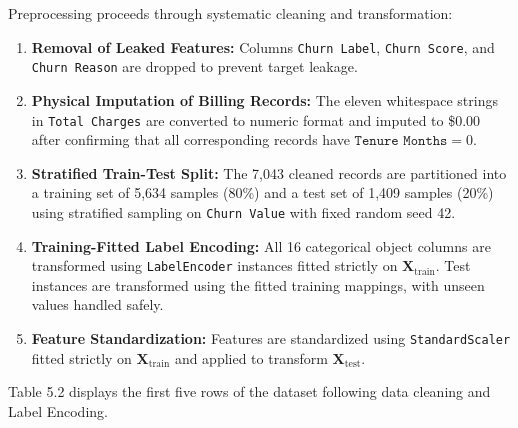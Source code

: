 \documentclass[12pt,oneside]{report}
\begin{document}
Preprocessing proceeds through systematic cleaning and transformation:
\begin{enumerate}
    \item \textbf{Removal of Leaked Features:} Columns \texttt{Churn Label}, \texttt{Churn Score}, and \texttt{Churn Reason} are dropped to prevent target leakage.
    \item \textbf{Physical Imputation of Billing Records:} The eleven whitespace strings in \texttt{Total Charges} are converted to numeric format and imputed to \$0.00 after confirming that all corresponding records have $\texttt{Tenure Months} = 0$.
    \item \textbf{Stratified Train-Test Split:} The 7,043 cleaned records are partitioned into a training set of 5,634 samples (80\%) and a test set of 1,409 samples (20\%) using stratified sampling on \texttt{Churn Value} with fixed random seed 42.
    \item \textbf{Training-Fitted Label Encoding:} All 16 categorical object columns are transformed using \texttt{LabelEncoder} instances fitted strictly on $\mathbf{X}_{\text{train}}$. Test instances are transformed using the fitted training mappings, with unseen values handled safely.
    \item \textbf{Feature Standardization:} Features are standardized using \texttt{StandardScaler} fitted strictly on $\mathbf{X}_{\text{train}}$ and applied to transform $\mathbf{X}_{\text{test}}$.
\end{enumerate}

Table 5.2 displays the first five rows of the dataset following data cleaning and Label Encoding.

\begin{table}[H]
\centering
\scriptsize
\caption{Preprocessed and Label Encoded Dataset (First 5 Rows after Preprocessing).}
\label{tab:5.2}
\vspace{0.05in}
\end{table}
\end{document}
